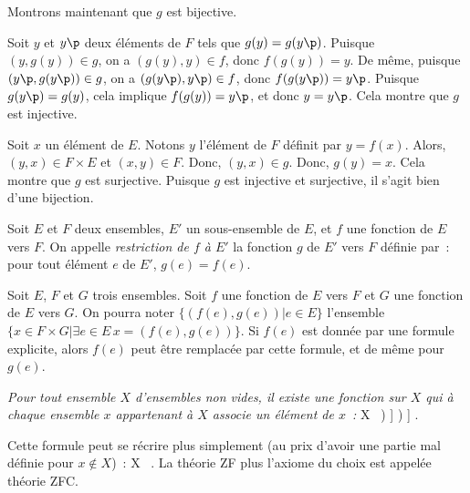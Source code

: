     Montrons maintenant que $g$ est bijective.
    \startitemize[nowhite]
        \item Soit $y$ et $y\p$ deux éléments de $F$ tels que $g(y) = g(y\p)$. 
            Puisque $(y,g(y)) \in g$, on a $(g(y),y) \in f$, donc $f(g(y)) = y$.
            De même, puisque $(y\p,g(y\p)) \in g$, on a $(g(y\p),y\p) \in f$, donc $f(g(y\p)) = y\p$.
            Puisque $g(y\p) = g(y)$, cela implique $f(g(y)) = y\p$, et donc $y = y\p$.
            Cela montre que $g$ est injective.
        \item Soit $x$ un élément de $E$. 
            Notons $y$ l'élément de $F$ définit par $y = f(x)$.
            Alors, $(y,x) \in F \times E$ et $(x,y) \in F$. 
            Donc, $(y,x) \in g$.
            Donc, $g(y) = x$.
            Cela montre que $g$ est surjective.
    \stopitemize
    Puisque $g$ est injective et surjective, il s'agit bien d'une bijection.

   \done 

\blank[medium]

\noindent{} Soit $E$ et $F$ deux ensembles, $E'$ un sous-ensemble de $E$, et $f$ une fonction de $E$ vers $F$. 
    On appelle \emph{restriction de $f$ à $E'$} la fonction $g$ de $E'$ vers $F$ définie par : pour tout élément $e$ de $E'$, $g(e) = f(e)$.

\blank[medium]

\noindent{} Soit $E$, $F$ et $G$ trois ensembles. 
    Soit $f$ une fonction de $E$ vers $F$ et $G$ une fonction de $E$ vers $G$.
    On pourra noter $\lbrace (f(e), g(e)) \vert e \in E \rbrace$ l'ensemble $\lbrace x \in F \times G \vert \exists e \in E \, x = (f(e), g(e)) \rbrace$. 
    Si $f(e)$ est donnée par une formule explicite, alors $f(e)$ peut être remplacée par cette formule, et de même pour $g(e)$.

\stopsubsection

\startsubsection[title=Axiome du choix]

\noindent\emph{  Pour tout ensemble $X$ d'ensembles non vides, il existe une fonction sur $X$ qui à chaque ensemble $x$ appartenant à $X$ associe un élément de $x$ :}
\startformula
    \forall X \, \left[ (\emptyset \notin X) \Rightarrow \left( \exists f: X \to \cup X \, \forall x \, [ (x \in X) \Rightarrow ( \exists y \, [((x,y) \in f) \wedge (y \in x)] ) ] \right) \right] .
\stopformula

\blank[medium]

\noindent Cette formule peut se récrire plus simplement (au prix d'avoir une partie mal définie pour $x \notin X$) :
\startformula
    \forall X \,  .
\stopformula
La théorie ZF plus l'axiome du choix est appelée théorie ZFC.

